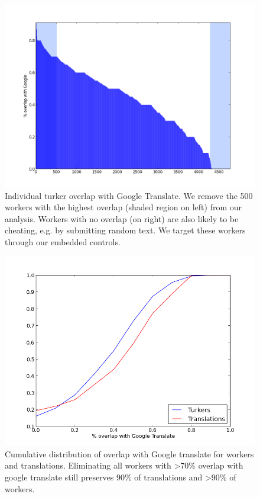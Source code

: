 \documentclass[11pt]{article}
\begin{document}
\begin{figure}[ht]
\includegraphics[width=\linewidth]{figures/turker-googmatch-distribution.png}
\caption{Individual turker overlap with Google Translate. We remove the 500 workers with the highest overlap (shaded region on left) from our analysis. Workers with no overlap (on right) are also likely to be cheating, e.g. by submitting random text. We target these workers through our embedded controls.}                
\label{dist}
\end{figure}

\begin{figure}[h]
\centering
\includegraphics[width=\linewidth]{figures/google-cdf-googlangs.png}
\caption{Cumulative distribution of overlap with Google translate for workers and translations. Eliminating all workers with \textgreater 70\% overlap with google translate still preserves 90\% of translations and \textgreater 90\% of workers.}
\label{cdf}
\end{figure}
\end{document}

